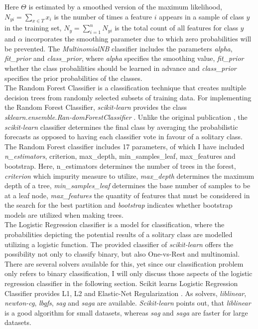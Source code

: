 \documentclass[a4paper, 11pt,titlepage,oneside,openany]{book}
\begin{document}
\noindent Here $\Theta$ is estimated by a smoothed version of the maximum likelihood, $N_{yi}=\sum_{x \in T}x_i$ is the number of times a feature $i$ appears in a sample of class $y$ in the training set, $N_y=\sum_{i=1}^{n}N_{yi}$ is the total count of all features for class $y$ and $\alpha$ incorporates the smoothing parameter due to which zero probabilities will be prevented.
The \textit{MultinomialNB} classifier includes the parameters \textit{alpha}, \textit{fit\_prior} and \textit{class\_prior}, where \textit{alpha} specifies the smoothing value, \textit{fit\_prior} whether the class probalilities should be learned in advance and \textit{class\_prior} specifies the prior probabilities of the classes.\\
\indent The Random Forest Classifier is a classification technique that creates multiple decision trees from randomly selected subsets of training data. For implementing the Random Forest Classifier, \textit{scikit-learn} provides the class \textit{sklearn.ensemble.Ran-domForestClassifier} \cite{coderandomforest}. Unlike the original publication \cite{randomforest}, the \textit{scikit-learn} classifier determines the final class by averaging the probabilistic forecasts as opposed to having each classifier vote in favour of a solitary class. The Random Forest classifier includes 17 parameters, of which I have included \textit{n\_estimators}, criterion, max\_depth, min\_samples\_leaf, max\_features and bootstrap. Here, n\_estimators determines the number of trees in the forest, \textit{criterion} which impurity measure to utilize, \textit{max\_depth} determines the maximum depth of a tree, \textit{min\_samples\_leaf} determines the base number of samples to be at a leaf node, \textit{max\_features} the quantity of features that must be considered in the search for the best partition and \textit{bootstrap} indicates whether bootstrap models are utilized when making trees.\\
\indent The Logistic Regression classifier is a model for classification, where the probabilities depicting the potential results of a solitary class are modelled utilizing a logistic function. The provided classifier of \textit{scikit-learn} offers the possibility not only to classify binary, but also One-vs-Rest and multinomial. There are several solvers available for this, yet since our classification problem only refers to binary classification, I will only discuss those aspects of the logistic regression classifier in the following section. Scikit learns Logistic Regression Classifier provides L1, L2 and Elastic-Net Regularization \cite{logisticregression}. As solvers, \textit{liblinear}, \textit{newton-cg}, \textit{lbgfs}, \textit{sag} and \textit{saga} are available. \textit{Scikit-learn} points out, that \textit{liblinear} is a good algorithm for small datasets, whereas \textit{sag} and \textit{saga} are faster for large datasets. 
\end{document}
